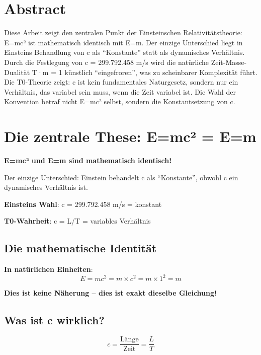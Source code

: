 \section*{Abstract}
		Diese Arbeit zeigt den zentralen Punkt der Einsteinschen Relativitätstheorie: E=mc² ist mathematisch identisch mit E=m. Der einzige Unterschied liegt in Einsteins Behandlung von c als ``Konstante'' statt als dynamisches Verhältnis. Durch die Festlegung von c = 299.792.458 m/s wird die natürliche Zeit-Masse-Dualität T·m = 1 künstlich ``eingefroren'', was zu scheinbarer Komplexität führt. Die T0-Theorie zeigt: c ist kein fundamentales Naturgesetz, sondern nur ein Verhältnis, das variabel sein muss, wenn die Zeit variabel ist. Die Wahl der Konvention betraf nicht E=mc² selbst, sondern die Konstantsetzung von c.

	
	
	
	\section{Die zentrale These: E=mc² = E=m}
	
	\begin{tcolorbox}[colback=red!5!white,colframe=red!75!black,title=Die zentrale Erkenntnis]
		\textbf{E=mc² und E=m sind mathematisch identisch!}
		
		Der einzige Unterschied: Einstein behandelt c als ``Konstante'', obwohl c ein dynamisches Verhältnis ist.
		
		\textbf{Einsteins Wahl}: c = 299.792.458 m/s = konstant
		
		\textbf{T0-Wahrheit}: c = L/T = variables Verhältnis
	\end{tcolorbox}
	
	\subsection{Die mathematische Identität}
	
	\textbf{In natürlichen Einheiten}:
	\begin{equation}
		E = mc^2 = m \times c^2 = m \times 1^2 = m
	\end{equation}
	
	\textbf{Dies ist keine Näherung – dies ist exakt dieselbe Gleichung!}
	
	\subsection{Was ist c wirklich?}
	
	\begin{equation}
		c = \frac{\text{Länge}}{\text{Zeit}} = \frac{L}{T}
	\end{equation}
	

